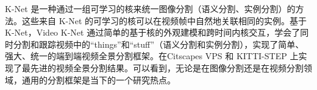 K-Net \cite{zhang2021k}是一种通过一组可学习的核来统一图像分割（语义分割、实例分割）的方法。这些来自 K-Net 的可学习的核可以在视频帧中自然地关联相同的实例。基于 K-Net，Video K-Net \cite{li2022video}通过简单的基于核的外观建模和跨时间内核交互，学会了同时分割和跟踪视频中的``things''和``stuff''（语义分割和实例分割），实现了简单、强大、统一的端到端视频全景分割框架。在Citscapes VPS 和 KITTI-STEP 上实现了最先进的视频全景分割结果。可以看到，无论是在图像分割还是在视频分割领域，通用的分割框架是当下的一个研究热点。